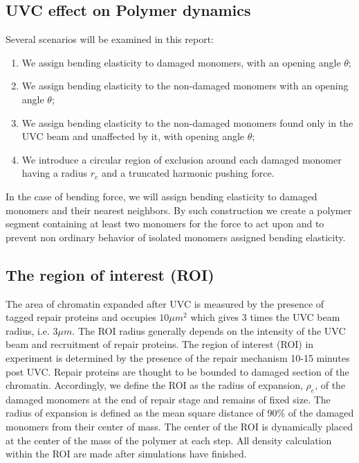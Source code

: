 \documentclass[12pt]{report}
\begin{document}
    \subsection{UVC effect on Polymer dynamics}\label{subsection:UvcEffectOnMonomers}
      Several scenarios will be examined in this report:
      \begin{enumerate}
      	\itemsep0em
      	\item We assign bending elasticity to damaged monomers, with an opening angle $\theta$;
      	\item We assign bending elasticity to the non-damaged monomers with an opening angle $\theta$;
      	\item We assign bending elasticity to the non-damaged monomers found only in the UVC beam and unaffected by it, with opening angle $\theta$;
      	\item We introduce a circular region of exclusion around each damaged monomer having a radius $r_e$ and a truncated harmonic pushing force.
      \end{enumerate}
      
      In the case of bending force, we will assign bending elasticity to damaged monomers and their nearest neighbors. By such construction we create a polymer segment containing at least two monomers for the force to act upon and to prevent non ordinary behavior of isolated monomers assigned bending elasticity.      
	
	\subsection{The region of interest (ROI)}\label{subsection:TheROI}
	
     The area of chromatin expanded after UVC is measured by the presence of tagged repair proteins and occupies $10 \mu m^2$ which gives 3 times the UVC beam radius, i.e. $3\mu m$. The ROI radius generally depends on the intensity of the UVC beam and recruitment of repair proteins. 
     The region of interest (ROI) in experiment is determined by the presence of the repair mechanism 10-15 minutes post UVC. Repair proteins are thought to be bounded to damaged section of the chromatin. Accordingly, we define the ROI as the radius of expansion, $\rho_e$, of the damaged monomers at the end of repair stage and remains of fixed size. The radius of expansion is defined as the mean square distance of 90\% of the damaged monomers from their center of mass. 
     The center of the ROI is dynamically placed at the center of the mass of the polymer at each step. All density calculation within the ROI are made after simulations have finished. 
							         
\end{document}
